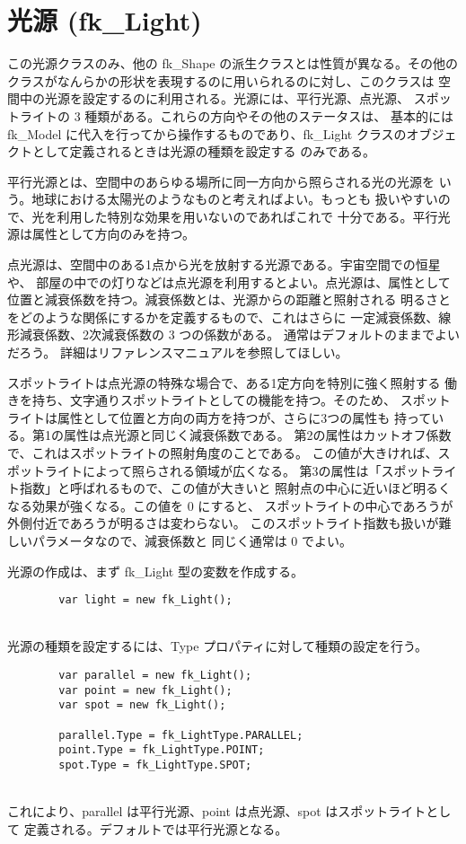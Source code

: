 \section{光源 (fk\_Light)}
この光源クラスのみ、他の fk\_Shape の派生クラスとは性質が異なる。その他の
クラスがなんらかの形状を表現するのに用いられるのに対し、このクラスは
空間中の光源を設定するのに利用される。光源には、平行光源、点光源、
スポットライトの 3 種類がある。これらの方向やその他のステータスは、
基本的には fk\_Model に代入を行ってから操作するものであり、fk\_Light
クラスのオブジェクトとして定義されるときは光源の種類を設定する
のみである。

平行光源とは、空間中のあらゆる場所に同一方向から照らされる光の光源を
いう。地球における太陽光のようなものと考えればよい。もっとも
扱いやすいので、光を利用した特別な効果を用いないのであればこれで
十分である。平行光源は属性として方向のみを持つ。

点光源は、空間中のある1点から光を放射する光源である。宇宙空間での恒星や、
部屋の中での灯りなどは点光源を利用するとよい。点光源は、属性として
位置と減衰係数を持つ。減衰係数とは、光源からの距離と照射される
明るさとをどのような関係にするかを定義するもので、これはさらに
一定減衰係数、線形減衰係数、2次減衰係数の 3 つの係数がある。
通常はデフォルトのままでよいだろう。
詳細はリファレンスマニュアルを参照してほしい。

スポットライトは点光源の特殊な場合で、ある1定方向を特別に強く照射する
働きを持ち、文字通りスポットライトとしての機能を持つ。そのため、
スポットライトは属性として位置と方向の両方を持つが、さらに3つの属性も
持っている。第1の属性は点光源と同じく減衰係数である。
第2の属性はカットオフ係数で、これはスポットライトの照射角度のことである。
この値が大きければ、スポットライトによって照らされる領域が広くなる。
第3の属性は「スポットライト指数」と呼ばれるもので、この値が大きいと
照射点の中心に近いほど明るくなる効果が強くなる。この値を 0 にすると、
スポットライトの中心であろうが外側付近であろうが明るさは変わらない。
このスポットライト指数も扱いが難しいパラメータなので、減衰係数と
同じく通常は 0 でよい。

光源の作成は、まず fk\_Light 型の変数を作成する。
\\
\begin{screen}
\begin{verbatim}
        var light = new fk_Light();
\end{verbatim}
\end{screen}
~ \\
光源の種類を設定するには、Type プロパティに対して種類の設定を行う。
\\
\begin{screen}
\begin{verbatim}
        var parallel = new fk_Light();
        var point = new fk_Light();
        var spot = new fk_Light();

        parallel.Type = fk_LightType.PARALLEL;
        point.Type = fk_LightType.POINT;
        spot.Type = fk_LightType.SPOT;
\end{verbatim}
\end{screen}
~ \\
これにより、parallel は平行光源、point は点光源、spot はスポットライトとして
定義される。デフォルトでは平行光源となる。

